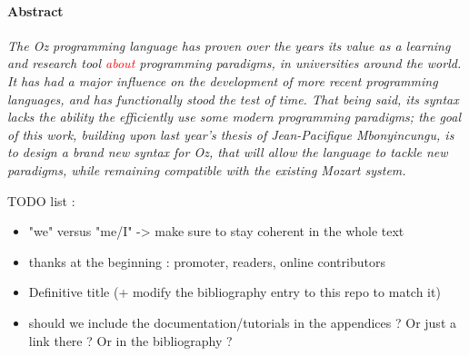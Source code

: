 
\paragraph{Abstract}
\textit{
The \textit{Oz} programming language has proven over the years its value as a learning and research tool \textcolor{red}{about} programming paradigms, in universities around the world.
It has had a major influence on the development of more recent programming languages, and has functionally stood the test of time.
That being said, its syntax lacks the ability the efficiently use some modern programming paradigms;
the goal of this work, building upon last year's thesis of Jean-Pacifique Mbonyincungu, is to design a brand new syntax for \textit{Oz}, that will allow the language to tackle new paradigms, while remaining compatible with the existing Mozart system.
}

TODO list :
\begin{itemize}
    \item "we" versus "me/I" -> make sure to stay coherent in the whole text
    \item thanks at the beginning : promoter, readers, online contributors
    \item Definitive title (+ modify the bibliography entry to this repo to match it)
    \item should we include the documentation/tutorials in the appendices ? Or just a link there ? Or in the bibliography ?
\end{itemize}